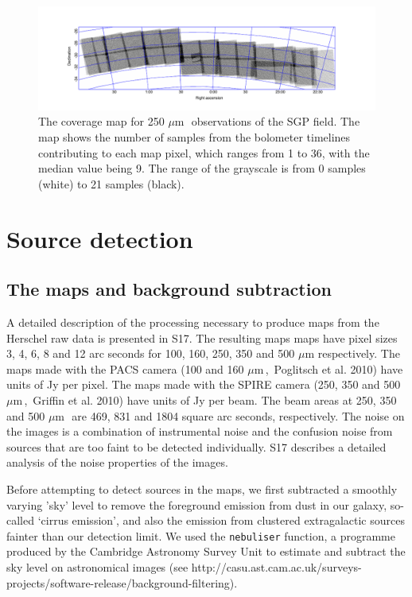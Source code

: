 \documentclass[useAMS,usenatbib]{mnras}
\def\mic{ $\mu $m\,}
\begin{document}
\begin{figure} %
\includegraphics[scale=1.]{sgpcoverage.pdf}
\caption{ \protect\label{skymaps} 
The coverage map for 250\mic\ observations
of the SGP field.
The map shows the number of samples from the bolometer timelines contributing
to each map pixel, which ranges from 1 to 36, with the median value being 9.
The range of the grayscale is from 0 samples (white) to 21 samples
(black).}
\end{figure}

\section{Source detection} 

\subsection{The maps and background subtraction} 

A detailed description of the processing necessary
to produce maps from the
Herschel raw data is presented in S17. The resulting maps maps have
pixel sizes 3, 4, 6, 8 and 12 arc seconds for 100, 160, 250, 350 and
500 $\mu$m respectively. The maps made with the PACS camera
(100 and 160\mic,\ Poglitsch et al. 2010) have units
of Jy per pixel. The maps made with the SPIRE camera
(250, 350 and 500\mic,\ Griffin et al. 2010) have units of Jy per beam.
The beam
areas at 250, 350 and 500\mic\ are 469, 831 and 1804 square arc seconds,
respectively.
The noise on the images is a combination of instrumental noise and the
confusion noise from sources that are too faint to be detected individually.
S17 describes a detailed analysis of the noise properties of the images.

Before attempting to detect sources in the maps, we first subtracted a
smoothly varying 'sky' level to remove the 
foreground emission from dust in our galaxy, so-called `cirrus emission',
and also the emission from
clustered extragalactic sources fainter
than
our detection limit. We
used the {\tt nebuliser} function, a programme produced
by the Cambridge Astronomy Survey Unit to estimate and
subtract the sky level on astronomical images (see
http://casu.ast.cam.ac.uk/surveys-projects/software-release/background-filtering). 
\end{document}
